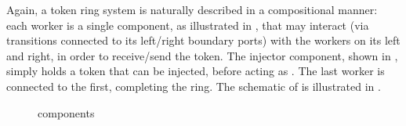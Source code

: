 Again, a token ring system is naturally described in a compositional manner:
each worker is a single component, as illustrated in , that
may interact (via transitions connected to its left/right boundary ports) with
the workers on its left and right, in order to receive/send the token. The
injector component, shown in , simply holds a token that
can be injected, before acting as \idC{}. The last worker is connected to the
first, completing the ring. The schematic of  is illustrated in
.

\begin{figure}[ht]
    \centering
    \begin{subfigure}{0.5\textwidth}
        \centering
        \caption{\injectorC{} }
        \label{fig:injectorC}
    \end{subfigure}%
    \begin{subfigure}{0.5\textwidth}
        \centering
    \caption{\workerC{} }
    \label{fig:workerC}
    \end{subfigure}
    \caption{\tokenringSys{\aN} components}
\end{figure}

